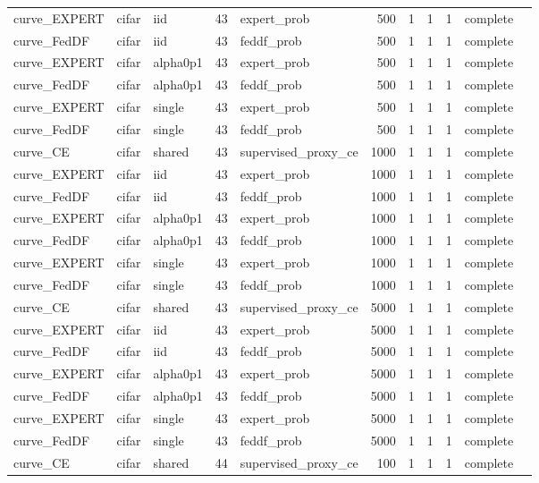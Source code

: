 \begin{tabular}{lllrlrrrrll}
curve\_EXPERT & cifar & iid & 43 & expert\_prob & 500 & 1 & 1 & 1 & complete &  \\
curve\_FedDF & cifar & iid & 43 & feddf\_prob & 500 & 1 & 1 & 1 & complete &  \\
curve\_EXPERT & cifar & alpha0p1 & 43 & expert\_prob & 500 & 1 & 1 & 1 & complete &  \\
curve\_FedDF & cifar & alpha0p1 & 43 & feddf\_prob & 500 & 1 & 1 & 1 & complete &  \\
curve\_EXPERT & cifar & single & 43 & expert\_prob & 500 & 1 & 1 & 1 & complete &  \\
curve\_FedDF & cifar & single & 43 & feddf\_prob & 500 & 1 & 1 & 1 & complete &  \\
curve\_CE & cifar & shared & 43 & supervised\_proxy\_ce & 1000 & 1 & 1 & 1 & complete &  \\
curve\_EXPERT & cifar & iid & 43 & expert\_prob & 1000 & 1 & 1 & 1 & complete &  \\
curve\_FedDF & cifar & iid & 43 & feddf\_prob & 1000 & 1 & 1 & 1 & complete &  \\
curve\_EXPERT & cifar & alpha0p1 & 43 & expert\_prob & 1000 & 1 & 1 & 1 & complete &  \\
curve\_FedDF & cifar & alpha0p1 & 43 & feddf\_prob & 1000 & 1 & 1 & 1 & complete &  \\
curve\_EXPERT & cifar & single & 43 & expert\_prob & 1000 & 1 & 1 & 1 & complete &  \\
curve\_FedDF & cifar & single & 43 & feddf\_prob & 1000 & 1 & 1 & 1 & complete &  \\
curve\_CE & cifar & shared & 43 & supervised\_proxy\_ce & 5000 & 1 & 1 & 1 & complete &  \\
curve\_EXPERT & cifar & iid & 43 & expert\_prob & 5000 & 1 & 1 & 1 & complete &  \\
curve\_FedDF & cifar & iid & 43 & feddf\_prob & 5000 & 1 & 1 & 1 & complete &  \\
curve\_EXPERT & cifar & alpha0p1 & 43 & expert\_prob & 5000 & 1 & 1 & 1 & complete &  \\
curve\_FedDF & cifar & alpha0p1 & 43 & feddf\_prob & 5000 & 1 & 1 & 1 & complete &  \\
curve\_EXPERT & cifar & single & 43 & expert\_prob & 5000 & 1 & 1 & 1 & complete &  \\
curve\_FedDF & cifar & single & 43 & feddf\_prob & 5000 & 1 & 1 & 1 & complete &  \\
curve\_CE & cifar & shared & 44 & supervised\_proxy\_ce & 100 & 1 & 1 & 1 & complete &  \\

\end{tabular}
